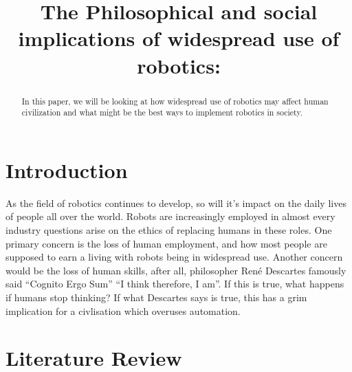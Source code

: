 \documentclass[conference]{IEEEtran}
\begin{document}
\title{The Philosophical and social implications of widespread use of robotics:
}

\author{
}

\maketitle

\begin{abstract}
In this paper, we will be looking at how widespread use of robotics may affect human civilization and what might be the best ways to implement robotics in society.
\end{abstract}



\section{Introduction}
As the field of robotics continues to develop, so will it's impact on the daily lives of people all over the world.
Robots are increasingly employed in almost every industry questions arise on the ethics of replacing humans in these roles. One primary concern is the loss of human employment, and how most people are supposed to earn a living with robots being in widespread use. Another concern would be the loss of human skills, after all, philosopher René Descartes famously said ``Cognito Ergo Sum'' ``I think therefore, I am''. If this is true, what happens if humans stop thinking? If what Descartes says is true, this has a grim implication for a civlisation which overuses automation.


\section{Literature Review}
%
%

\printbibliography

\vspace{12pt}
\color{red}
\end{document}
